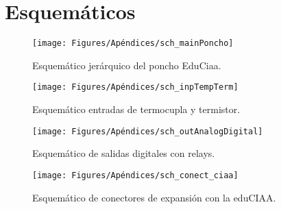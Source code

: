 
\chapter{Esquemáticos} %

\label{AppendixB} %

\begin{figure}[h!]
	\centering
	\texttt{[image: Figures/Apéndices/sch\_mainPoncho]}
	\caption{Esquemático jerárquico del poncho EduCiaa.}
	\label{fig:schMainPoncho}
\end{figure}


\begin{figure}[h!]
	\centering
	\texttt{[image: Figures/Apéndices/sch\_inpTempTerm]}
	\caption{Esquemático entradas de termocupla y termistor.}
	\label{fig:schEntradas}
\end{figure}


\begin{figure}[h!]
	\centering
	\texttt{[image: Figures/Apéndices/sch\_outAnalogDigital]}
	\caption{Esquemático de salidas digitales con relays.}
	\label{fig:schSalidas}
\end{figure}

\begin{figure}[h!]
	\centering
	\texttt{[image: Figures/Apéndices/sch\_conect\_ciaa]}
	\caption{Esquemático de conectores de expansión con la eduCIAA.}
	\label{fig:schSalidas}
\end{figure}


